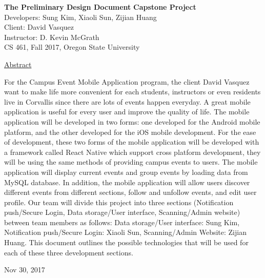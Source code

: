 \documentclass[letterpaper, 10pt,titlepage]{article}
\newcommand\tab[1][1cm]{\hspace*{#1}}
\begin{document}
\begin{titlepage}
\begin{center}
    \Huge
    \textbf{The Preliminary Design Document}
    \textbf{Capstone Project}\\
    \vspace{1.0cm}
    \large
    Developers: Sung Kim, Xiaoli Sun, Zijian Huang\\
    Client: David Vasquez\\
    \vspace{1.5cm}
    \large
    Instructor: D. Kevin McGrath\\

    \large
    CS 461, Fall 2017, Oregon State University\\    

    \vspace{3.2cm}

    \large
    \underline{Abstract}\\
    \vspace{0.3cm}
    \end{center}
    \large

    \tab For the Campus Event Mobile Application program, the client David Vasquez want to make life more convenient for each students, instructors or even residents live in Corvallis since there are lots of events happen everyday. A great mobile application is useful for every user and improve the quality of life. The mobile application will be developed in two forms: one developed for the Android mobile platform, and the other developed for the iOS mobile development. For the ease of development, these two forms of the mobile application will be developed with a framework called React Native which support cross platform development, they will be using the same methods of providing campus events to users. The mobile application will display current events and group events by loading data from MySQL database. In addition, the mobile application will allow users discover different events from different sections, follow and unfollow events, and edit user profile. Our team will divide this project into three sections (Notification push/Secure Login, Data storage/User interface, Scanning/Admin website) between team members as follows: Data storage/User interface: Sung Kim, Notification push/Secure Login: Xiaoli Sun, Scanning/Admin Website: Zijian Huang. This document outlines the possible technologies that will be used for each of these three development sections.  
    \vspace{0.8cm}
    \vfill
    
\begin{center}    
    Nov 30, 2017

\end{center}
\end{titlepage}
\end{document}
